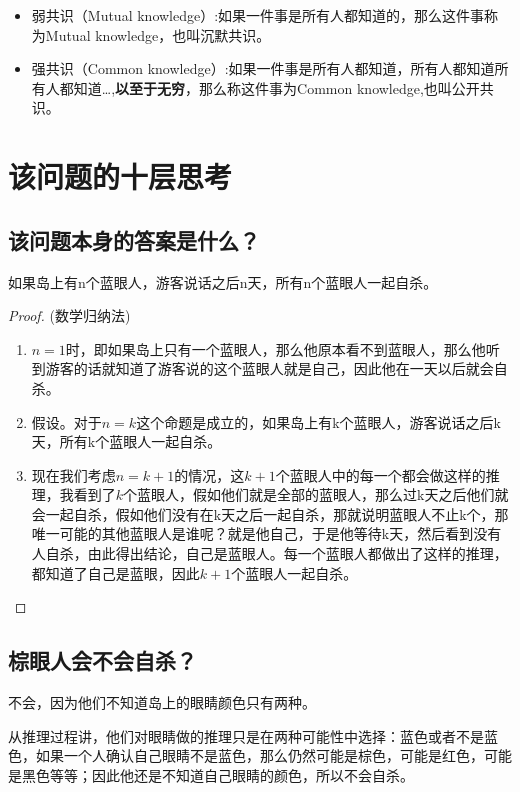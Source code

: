 \documentclass[lang=cn,11pt,a4paper]{elegantpaper}
\begin{document}
\begin{itemize}
\item 弱共识（Mutual knowledge）:如果一件事是所有人都知道的，那么这件事称为Mutual knowledge，也叫沉默共识。
\item 强共识（Common knowledge）:如果一件事是所有人都知道，所有人都知道所有人都知道\ldots,\textbf{以至于无穷}，那么称这件事为Common knowledge,也叫公开共识。
\end{itemize}

\section{该问题的十层思考}

\subsection{该问题本身的答案是什么？}

如果岛上有n个蓝眼人，游客说话之后n天，所有n个蓝眼人一起自杀。

\begin{proof}(数学归纳法)
\begin{enumerate}
\item $n=1$时，即如果岛上只有一个蓝眼人，那么他原本看不到蓝眼人，那么他听到游客的话就知道了游客说的这个蓝眼人就是自己，因此他在一天以后就会自杀。
\item 假设。对于$n=k$这个命题是成立的，如果岛上有k个蓝眼人，游客说话之后k天，所有k个蓝眼人一起自杀。
\item 现在我们考虑$n=k+1$的情况，这$k+1$个蓝眼人中的每一个都会做这样的推理，我看到了$k$个蓝眼人，假如他们就是全部的蓝眼人，那么过k天之后他们就会一起自杀，假如他们没有在k天之后一起自杀，那就说明蓝眼人不止k个，那唯一可能的其他蓝眼人是谁呢？就是他自己，于是他等待k天，然后看到没有人自杀，由此得出结论，自己是蓝眼人。每一个蓝眼人都做出了这样的推理，都知道了自己是蓝眼，因此$k+1$个蓝眼人一起自杀。
\end{enumerate}
\end{proof}

\subsection{棕眼人会不会自杀？}

不会，因为他们不知道岛上的眼睛颜色只有两种。

从推理过程讲，他们对眼睛做的推理只是在两种可能性中选择：蓝色或者不是蓝色，如果一个人确认自己眼睛不是蓝色，那么仍然可能是棕色，可能是红色，可能是黑色等等；因此他还是不知道自己眼睛的颜色，所以不会自杀。
\end{document}
